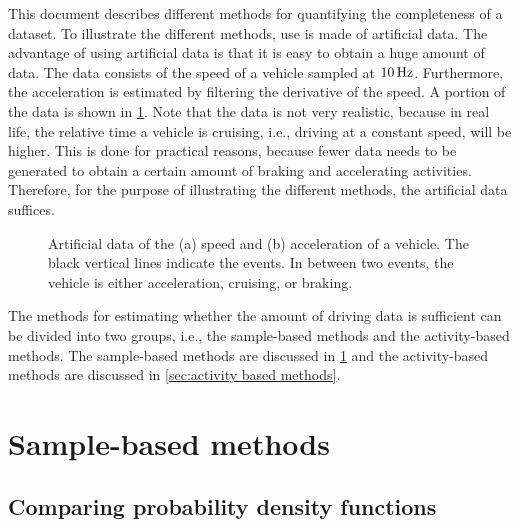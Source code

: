 \documentclass[10pt,final,a4paper,oneside,onecolumn]{article}
\newlength\figurewidth
\newlength\figureheight
\theoremstyle{plain}\newtheorem{definition}{Definition}[section]    %
\theoremstyle{definition}\newtheorem{example}{Example}[section]     %
\theoremstyle{remark}\newtheorem{remarkenv}{Remark}[section]        %
\begin{document}
This document describes different methods for quantifying the completeness of a dataset. To illustrate the different methods, use is made of artificial data. The advantage of using artificial data is that it is easy to obtain a huge amount of data. The data consists of the speed of a vehicle sampled at $\unit[10]{Hz}$. Furthermore, the acceleration is estimated by filtering the derivative of the speed. A portion of the data is shown in \cref{fig:artificial data}. Note that the data is not very realistic, because in real life, the relative time a vehicle is cruising, i.e., driving at a constant speed, will be higher. This is done for practical reasons, because fewer data needs to be generated to obtain a certain amount of braking and accelerating activities. Therefore, for the purpose of illustrating the different methods, the artificial data suffices.

\setlength{}              %
\setlength{}              %
\begin{figure}
	\centering
	\begin{minipage}{\linewidth}
		\centering
	\end{minipage}
	\begin{minipage}{\linewidth}
		\centering
	\end{minipage}
	\caption{Artificial data of the (a) speed and (b) acceleration of a vehicle. The black vertical lines indicate the events. In between two events, the vehicle is either acceleration, cruising, or braking.}
	\label{fig:artificial data}	
\end{figure}

The methods for estimating whether the amount of driving data is sufficient can be divided into two groups, i.e., the sample-based methods and the activity-based methods. The sample-based methods are discussed in \cref{sec:sample based} and the activity-based methods are discussed in \cref{sec:activity based methods}.


\section{Sample-based methods}
\label{sec:sample based}


\subsection{Comparing probability density functions}
\label{sec:sample based pdf}
\end{document}
